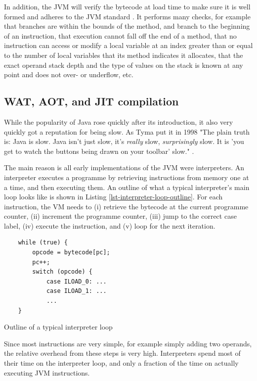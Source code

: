 In addition, the JVM will verify the bytecode at load time to make sure it is well formed and adheres to the JVM standard \cite{Lindholm:2017vu}. It performs many checks, for example that branches are within the bounds of the method, and branch to the beginning of an instruction, that execution cannot fall off the end of a method, that no instruction can access or modify a local variable at an index greater than or equal to the number of local variables that its method indicates it allocates, that the exact operand stack depth and the type of values on the stack is known at any point and does not over- or underflow, etc.

\subsection{WAT, AOT, and JIT compilation}
While the popularity of Java rose quickly after its introduction, it also very quickly got a reputation for being slow. As Tyma put it in 1998 "The plain truth is: Java is slow. Java isn't just slow, it's \emph{really} slow, \emph{surprisingly} slow. It is 'you get to watch the buttons being drawn on your toolbar' slow." \cite{Tyma:1998vj}.

The main reason is all early implementations of the JVM were interpreters. An interpreter executes a programme by retrieving instructions from memory one at a time, and then executing them. An outline of what a typical interpreter's main loop looks like is shown in Listing \ref{lst-interpreter-loop-outline}. For each instruction, the VM needs to (i) retrieve the bytecode at the current programme counter, (ii) increment the programme counter, (iii) jump to the correct case label, (iv) execute the instruction, and (v) loop for the next iteration.

\begin{listing}
    \centering
    \begin{verbatim}
    while (true) {
        opcode = bytecode[pc];
        pc++;
        switch (opcode) {
            case ILOAD_0: ...
            case ILOAD_1: ...
            ...
    }
    \end{verbatim}
\caption{Outline of a typical interpreter loop}
\label{lst-interpreter-loop-outline}
\end{listing}

Since most instructions are very simple, for example simply adding two operands, the relative overhead from these steps is very high. Interpreters spend most of their time on the interpreter loop, and only a fraction of the time on actually executing JVM instructions.

